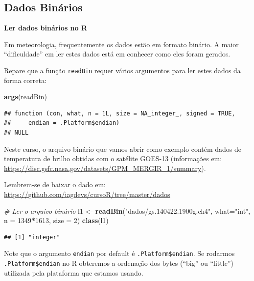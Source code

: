 \documentclass[]{book}
\newenvironment{Shaded}{\begin{snugshade}}{\end{snugshade}}
\newcommand{\KeywordTok}[1]{\textcolor[rgb]{0.13,0.29,0.53}{\textbf{#1}}}
\newcommand{\DataTypeTok}[1]{\textcolor[rgb]{0.13,0.29,0.53}{#1}}
\newcommand{\DecValTok}[1]{\textcolor[rgb]{0.00,0.00,0.81}{#1}}
\newcommand{\StringTok}[1]{\textcolor[rgb]{0.31,0.60,0.02}{#1}}
\newcommand{\CommentTok}[1]{\textcolor[rgb]{0.56,0.35,0.01}{\textit{#1}}}
\newcommand{\OperatorTok}[1]{\textcolor[rgb]{0.81,0.36,0.00}{\textbf{#1}}}
\newcommand{\NormalTok}[1]{#1}
\theoremstyle{definition}
\theoremstyle{definition}
\theoremstyle{definition}
\theoremstyle{remark}
\begin{document}
\subsection{Dados Binários}\label{dados-binarios}

\textbf{Ler dados binários no R}

Em meteorologia, frequentemente os dados estão em formato binário. A
maior ``dificuldade'' em ler estes dados está em conhecer como eles
foram gerados.

Repare que a função \texttt{readBin} requer vários argumentos para ler
estes dados da forma correta:

\begin{Shaded}
\begin{Highlighting}[]
\KeywordTok{args}\NormalTok{(readBin)}
\end{Highlighting}
\end{Shaded}

\begin{verbatim}
## function (con, what, n = 1L, size = NA_integer_, signed = TRUE, 
##     endian = .Platform$endian) 
## NULL
\end{verbatim}

Neste curso, o arquivo binário que vamos abrir como exemplo contém dados
de temperatura de brilho obtidas com o satélite GOES-13 (informações em:
\url{https://disc.gsfc.nasa.gov/datasets/GPM_MERGIR_1/summary}).

Lembrem-se de baixar o dado em:
\url{https://github.com/iagdevs/cursoR/tree/master/dados}

\begin{Shaded}
\begin{Highlighting}[]
\CommentTok{# Ler o arquivo binário}
\NormalTok{l1 <-}\StringTok{ }\KeywordTok{readBin}\NormalTok{(}\StringTok{"dados/gs.140422.1900g.ch4"}\NormalTok{, }
              \DataTypeTok{what=}\StringTok{"int"}\NormalTok{, }
              \DataTypeTok{n =} \DecValTok{1349}\OperatorTok{*}\DecValTok{1613}\NormalTok{,}
              \DataTypeTok{size =} \DecValTok{2}\NormalTok{)}
\KeywordTok{class}\NormalTok{(l1)}
\end{Highlighting}
\end{Shaded}

\begin{verbatim}
## [1] "integer"
\end{verbatim}

Note que o argumento \texttt{endian} por default é
\texttt{.Platform\$endian}. Se rodarmos \texttt{.Platform\$endian} no R
obteremos a ordenação dos bytes (``big'' ou ``little'') utilizada pela
plataforma que estamos usando.
\end{document}
